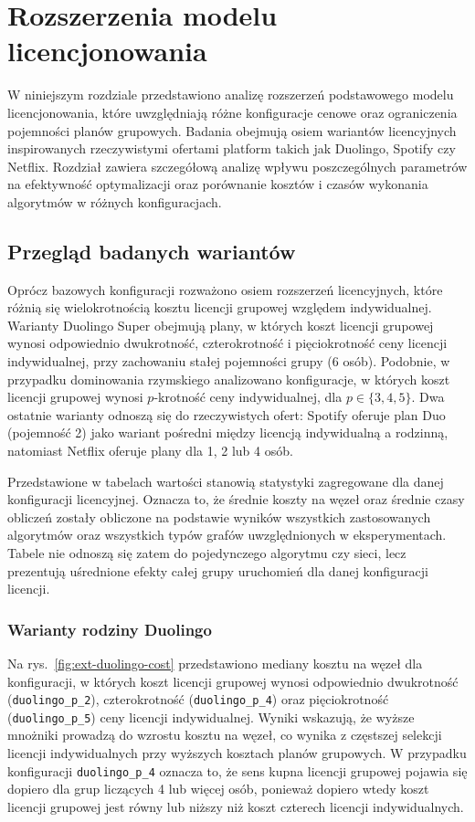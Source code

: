 \chapter{Rozszerzenia modelu licencjonowania}\label{chap:extensions}

W niniejszym rozdziale przedstawiono analizę rozszerzeń podstawowego modelu licencjonowania, które uwzględniają różne konfiguracje cenowe oraz ograniczenia pojemności planów grupowych. Badania obejmują osiem wariantów licencyjnych inspirowanych rzeczywistymi ofertami platform takich jak Duolingo, Spotify czy Netflix. Rozdział zawiera szczegółową analizę wpływu poszczególnych parametrów na efektywność optymalizacji oraz porównanie kosztów i czasów wykonania algorytmów w różnych konfiguracjach.

\section{Przegląd badanych wariantów}
Oprócz bazowych konfiguracji rozważono osiem rozszerzeń licencyjnych, które różnią się wielokrotnością kosztu licencji grupowej względem indywidualnej. Warianty Duolingo Super obejmują plany, w których koszt licencji grupowej wynosi odpowiednio dwukrotność, czterokrotność i pięciokrotność ceny licencji indywidualnej, przy zachowaniu stałej pojemności grupy (6 osób). Podobnie, w przypadku dominowania rzymskiego analizowano konfiguracje, w których koszt licencji grupowej wynosi $p$-krotność ceny indywidualnej, dla $p \in \{3, 4, 5\}$. Dwa ostatnie warianty odnoszą się do rzeczywistych ofert: Spotify oferuje plan Duo (pojemność 2) jako wariant pośredni między licencją indywidualną a rodzinną, natomiast Netflix oferuje plany dla 1, 2 lub 4 osób.

Przedstawione w tabelach wartości stanowią statystyki zagregowane dla danej konfiguracji licencyjnej. Oznacza to, że średnie koszty na węzeł oraz średnie czasy obliczeń zostały obliczone na podstawie wyników wszystkich zastosowanych algorytmów oraz wszystkich typów grafów uwzględnionych w eksperymentach. Tabele nie odnoszą się zatem do pojedynczego algorytmu czy sieci, lecz prezentują uśrednione efekty całej grupy uruchomień dla danej konfiguracji licencji.


\subsection{Warianty rodziny Duolingo}
Na rys.~\ref{fig:ext-duolingo-cost} przedstawiono mediany kosztu na węzeł dla konfiguracji, w których koszt licencji grupowej wynosi odpowiednio dwukrotność (\texttt{duolingo\_p\_2}), czterokrotność (\texttt{duolingo\_p\_4}) oraz pięciokrotność (\texttt{duolingo\_p\_5}) ceny licencji indywidualnej. Wyniki wskazują, że wyższe mnożniki prowadzą do wzrostu kosztu na węzeł, co wynika z częstszej selekcji licencji indywidualnych przy wyższych kosztach planów grupowych. W przypadku konfiguracji \texttt{duolingo\_p\_4} oznacza to, że sens kupna licencji grupowej pojawia się dopiero dla grup liczących 4 lub więcej osób, ponieważ dopiero wtedy koszt licencji grupowej jest równy lub niższy niż koszt czterech licencji indywidualnych.

